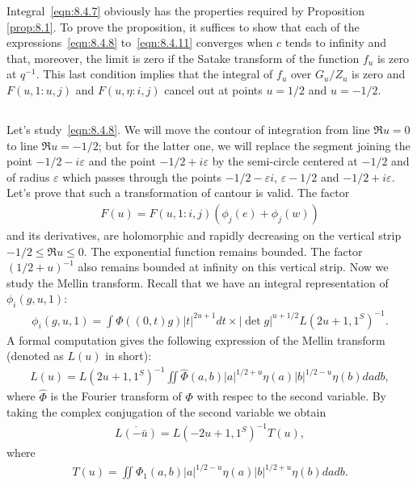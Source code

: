 Integral~\eqref{eqn:8.4.7} obviously has the properties required by Proposition \ref{prop:8.1}.
To prove the proposition, it suffices to show that each of the expressions~\eqref{eqn:8.4.8} to~\eqref{eqn:8.4.11} converges when $c$ tends to infinity
and that, moreover, the limit is zero if the Satake transform of the function $f_u$ is zero at $q^{-1}$.
This last condition implies that the integral of $f_u$ over $G_u/Z_u$ is zero and  $F(u, 1:u, j)$ and $F(u, \eta:i, j)$ cancel out at points $u =1/2$ and $u=-1/2$.


\subsection{}
Let's study~\eqref{eqn:8.4.8}.
We will move the contour of integration from line $\Re u = 0$ to line $\Re u = -1/2$; 
but for the latter one, we will replace the segment joining the point $-1/2-i\varepsilon$ and the point $-1/2+i\varepsilon$ by the semi-circle centered at $-1/2$ and of radius $\varepsilon$
which passes through the points $-1/2-\varepsilon i$, $\varepsilon-1/2$ and $-1/2+i\varepsilon$.
Let's prove that such a transformation of cantour is valid.
The factor
\begin{align*}
    F(u) = F(u, 1:i, j)(\phi_j(e) + \phi_j(w))
\end{align*}
and its derivatives, are holomorphic and rapidly decreasing on the vertical strip $-1/2\leq \Re u \leq 0$.
The exponential function remains bounded.
The factor $(1/2+u)^{-1}$ also remains bounded at infinity on this vertical strip.
Now we study the Mellin transform.
Recall that we have an integral representation of $\phi_i(g, u, 1)$:
\begin{align*}
    \phi_i(g, u, 1) = \int \Phi((0, t) g) |t|^{2u+1} dt \times |\det g|^{u+1/2} L(2u+1, 1^{S})^{-1}.
\end{align*}
A formal computation gives the following expression of the Mellin transform (denoted as $L(u)$ in short):
\begin{align}
    L(u) = L(2u+1, 1^{S})^{-1} \iint \hat{\Phi}(a, b) |a|^{1/2+u} \eta(a) |b|^{1/2-u} \eta(b) dadb,
\end{align}
where $\hat{\Phi}$ is the Fourier transform of $\Phi$ with respec to the second variable.
By taking the complex conjugation of the second variable we obtain
\begin{align}
    \overline{L(-\bar{u})} = L(-2u+1, 1^{S})^{-1}T(u),
\end{align}
where
\begin{align}
    T(u) = \iint \Phi_1(a, b)|a|^{1/2-u} \eta(a) |b|^{1/2+u} \eta(b) dadb.
\end{align}
